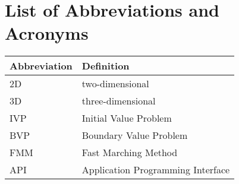 \documentclass{stdlocal}
\begin{document}
  \section*{List of Abbreviations and Acronyms}

  \begin{table}[H]
    \center
    \renewcommand{\arraystretch}{1.3}
    \begin{tabularx}{\textwidth}{lX}
      \hline
      \textbf{Abbreviation} & \textbf{Definition} \\
      \hline
      \hline
      2D & two-dimensional \\
      3D & three-dimensional \\
      IVP & Initial Value Problem \\
      BVP & Boundary Value Problem \\
      FMM & Fast Marching Method \\
      API & Application Programming Interface \\
      \hline
    \end{tabularx}
  \end{table}
\end{document}
